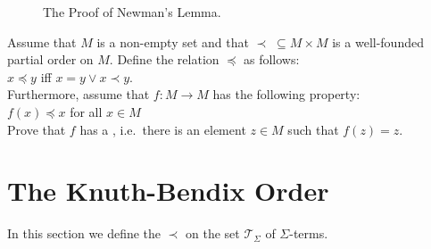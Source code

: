 \begin{figure}[!ht]
  \centering
  \caption{The Proof of Newman's Lemma.}
  \label{fig:newman.pdf}
\end{figure}


\exercise
Assume that $M$ is a non-empty set and that $\prec\; \subseteq M\times M$ is a well-founded partial order on $M$.
Define the relation $\preceq$ as follows:
\\[0.2cm]
\hspace*{1.3cm}
$x \preceq y$ \quad iff \quad $x = y \vee x \prec y$.
\\[0.2cm]
Furthermore, assume that $f:M \rightarrow M$ has the following property:
\\[0.2cm]
\hspace*{1.3cm}
$f(x) \preceq x$ \quad for all $x \in M$
\\[0.2cm]
Prove that $f$ has a , i.e.~there is an element $z \in M$ such that $f(z) = z$.
\eoxs

\section{The Knuth-Bendix Order}
In this section we define the  $\prec$ on the set $\mathcal{T}_\Sigma$ of
$\Sigma$-terms.

